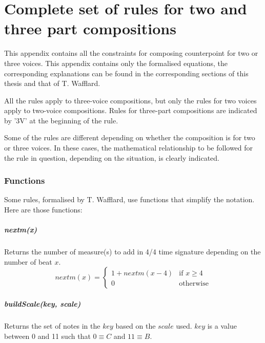 \chapter{Complete set of rules for two and three part compositions}\label{appendix:complete-set-of-rule}
This appendix contains all the constraints for composing counterpoint for two or three voices. This appendix contains only the formalised equations, the corresponding explanations can be found in the corresponding sections of this thesis and that of T. Wafflard.

All the rules apply to three-voice compositions, but only the rules for two voices apply to two-voice compositions. Rules for three-part compositions are indicated by '3V' at the beginning of the rule.


Some of the rules are different depending on whether the composition is for two or three voices. In these cases, the mathematical relationship to be followed for the rule in question, depending on the situation, is clearly indicated.


\subsection*{Functions}
Some rules, formalised by T. Wafflard, use functions that simplify the notation. Here are those functions:
\paragraph{nextm(x)} Returns the number of measure(s) to add in 4/4 time signature depending on the number of beat $x$.
\begin{equation}
    nextm(x) = \begin{cases}
        1 + nextm(x-4)& \text{if } x \geq 4\\
        0 & \text{otherwise}
    \end{cases}
    \label{eq:nextm}
\end{equation}

\paragraph{buildScale(key, scale)} Returns the set of notes in the $key$ based on the $scale$ used. $key$ is a value between 0 and 11 such that $0 \equiv C$ and $11 \equiv B$.

